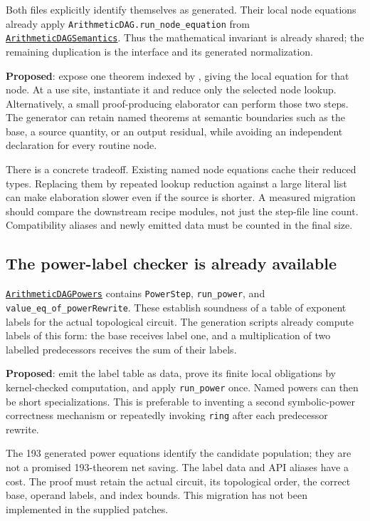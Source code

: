 \documentclass[11pt,letterpaper]{article}
\newcommand{\code}[1]{\nolinkurl{#1}}
\newcommand{\src}[1]{\href{https://github.com/VladimirReshetnikov/ProveIt/blob/60e9c5d620c6c387d932876cfa2d9376f64ea56c/Computability/DiophantineConsistency/Lean/DiophantineConsistency/#1.lean}{\texttt{#1}}}
\newcommand{\proposed}{\textbf{Proposed}}
\begin{document}
Both files explicitly identify themselves as generated. Their local node
equations already apply \code{ArithmeticDAG.run_node_equation} from
\src{ArithmeticDAGSemantics}. Thus the mathematical invariant is already shared;
the remaining duplication is the interface and its generated normalization.

\proposed: expose one theorem indexed by
\texttt{}, giving the local equation for that node.
At a use site, instantiate it and reduce only the selected node lookup.
Alternatively, a small proof-producing elaborator can perform those two steps.
The generator can retain named theorems at semantic boundaries such as the
base, a source quantity, or an output residual, while avoiding an independent
declaration for every routine node.

There is a concrete tradeoff. Existing named node equations cache their reduced
types. Replacing them by repeated lookup reduction against a large literal list
can make elaboration slower even if the source is shorter. A measured migration
should compare the downstream recipe modules, not just the step-file line count.
Compatibility aliases and newly emitted data must be counted in the final size.

\subsection{The power-label checker is already available}

\src{ArithmeticDAGPowers} contains \code{PowerStep}, \code{run_power}, and
\code{value_eq_of_powerRewrite}. These establish soundness of a table of
exponent labels for the actual topological circuit. The generation scripts
already compute labels of this form: the base receives label one, and a
multiplication of two labelled predecessors receives the sum of their labels.

\proposed: emit the label table as data, prove its finite local obligations by
kernel-checked computation, and apply \code{run_power} once. Named powers can
then be short specializations. This is preferable to inventing a second
symbolic-power correctness mechanism or repeatedly invoking \code{ring} after
each predecessor rewrite.

The 193 generated power equations identify the candidate population; they are
not a promised 193-theorem net saving. The label data and API aliases have a
cost. The proof must retain the actual circuit, its topological order, the
correct base, operand labels, and index bounds. This migration has not been
implemented in the supplied patches.
\end{document}
